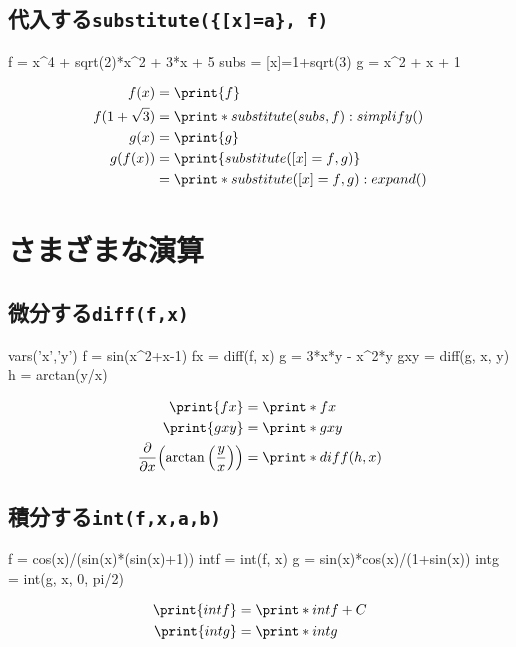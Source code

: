 \documentclass{jlreq}
\begin{document}
\subsection{代入する\quad\texttt{substitute(\{[x]=a\}, f)}}
\begin{CAS}
	f = x^4 + sqrt(2)*x^2 + 3*x + 5
	subs = {[x]=1+sqrt(3)}
	g = x^2 + x + 1
\end{CAS}
\begin{align*}
	f(x)          & =\print{f}                               \\
	f(1+\sqrt{3}) & =\print*{substitute(subs,f):simplify()}  \\
	g(x)          & =\print{g}                               \\
	g(f(x))       & =\print{substitute({[x]=f},g)}           \\
	              & =\print*{substitute({[x]=f},g):expand()}
\end{align*}

\newpage

\section{さまざまな演算}


\subsection{微分する\quad\texttt{diff(f,x)}}
\begin{CAS}
	vars('x','y')
	f = sin(x^2+x-1)
	fx = diff(f, x)
	g = 3*x*y - x^2*y
	gxy = diff(g, x, y)
	h = arctan(y/x)
\end{CAS}
\begin{align*}
	\print{fx}                              & =\print*{fx}        \\
	\print{gxy}                             & =\print*{gxy}       \\
	\pdv{}{x}\qty(\arctan\qty(\frac{y}{x})) & =\print*{diff(h,x)}
\end{align*}


\subsection{積分する\quad\texttt{int(f,x,a,b)}}
\begin{CAS}
	f = cos(x)/(sin(x)*(sin(x)+1))
	intf = int(f, x)
	g = sin(x)*cos(x)/(1+sin(x))
	intg = int(g, x, 0, pi/2)
\end{CAS}
\begin{align*}
	\print{intf} & =\print*{intf}+C \\
	\print{intg} & =\print*{intg}
\end{align*}
\end{document}
